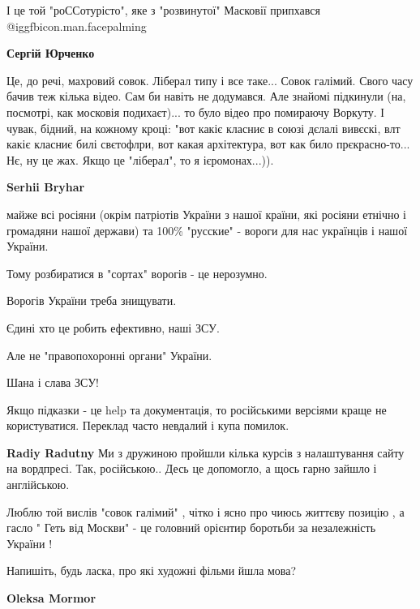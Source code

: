 \begin{itemize}
І це той "роССотурісто", яке з "розвинутої" Масковії припхався  @igg{fbicon.man.facepalming} 

\begin{itemize} %
\textbf{Сергій Юрченко} 

Це, до речі, махровий совок. Ліберал типу і все таке... Совок галімий. Свого
часу бачив теж кілька відео. Сам би навіть не додумався. Але знайомі підкинули
(на, посмотрі, как московія подихаєт)... то було відео про помираючу Воркуту. І
чувак, бідний, на кожному кроці: "вот какіє класниє в союзі дєлалі вивєскі, влт
какіє класниє билі свєтофлри, вот какая архітектура, вот как било
прєкрасно-то... Нє, ну це жах. Якщо це "ліберал", то я ієромонах...)).

\textbf{Serhii Bryhar} 

майже всі росіяни (окрім патріотів України з нашої країни, які росіяни етнічно
і громадяни нашої держави) та 100\% "русские" - вороги для нас українців і
нашої України.

Тому розбиратися в "сортах" ворогів - це нерозумно.

Ворогів України треба знищувати.

Єдині хто це робить ефективно, наші ЗСУ.

Але не "правопохоронні органи" України.

Шана і слава ЗСУ!
\end{itemize} %


Якщо підказки - це help та документація, то російськими версіями краще не
користуватися. Переклад часто невдалий і купа помилок.

\begin{itemize} %
\textbf{Radiy Radutny} Ми з дружиною пройшли кілька курсів з налаштування сайту на вордпресі. Так, російською.. Десь це допомогло, а щось гарно зайшло і англійською.
\end{itemize} %


Люблю той вислів "совок галімий" , чітко і ясно про чиюсь життєву позицію , а
гасло " Геть від Москви" - це головний орієнтир боротьби за незалежність
України !

Напишіть, будь ласка, про які художні фільми йшла мова?

\begin{itemize} %
\textbf{Oleksa Mormor} 


\end{itemize}
\end{itemize}
